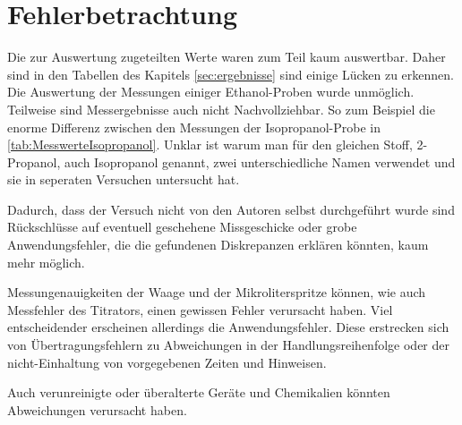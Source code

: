 \section{Fehlerbetrachtung}
\label{sec:fehler}

Die zur Auswertung zugeteilten Werte waren zum Teil kaum auswertbar. Daher sind in den Tabellen des Kapitels \ref{sec:ergebnisse} sind einige Lücken zu erkennen. Die Auswertung der Messungen einiger Ethanol-Proben wurde unmöglich. Teilweise sind Messergebnisse auch nicht Nachvollziehbar. So zum Beispiel die enorme Differenz zwischen den Messungen der Isopropanol-Probe in \ref{tab:MesswerteIsopropanol}. Unklar ist warum man für den gleichen Stoff, 2-Propanol, auch Isopropanol genannt, zwei unterschiedliche Namen verwendet und sie in seperaten Versuchen untersucht hat. 

Dadurch, dass der Versuch nicht von den Autoren selbst durchgeführt wurde sind Rückschlüsse auf eventuell geschehene Missgeschicke oder grobe Anwendungsfehler, die die gefundenen Diskrepanzen erklären könnten, kaum mehr möglich. 

Messungenauigkeiten der Waage und der Mikroliterspritze können, wie auch Messfehler des Titrators, einen gewissen Fehler verursacht haben. Viel entscheidender erscheinen allerdings die Anwendungsfehler. Diese erstrecken sich von Übertragungsfehlern zu Abweichungen in der Handlungsreihenfolge oder der nicht-Einhaltung von vorgegebenen Zeiten und Hinweisen.

Auch verunreinigte oder überalterte Geräte und Chemikalien könnten Abweichungen verursacht haben.